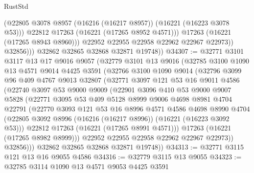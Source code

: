 \begin{lexlean}{RustStd}
\begin{coremodule}
                      (@22805 @3078 @8957 (@16216 (@16217 @8957)) (@16221 (@16223 @3078 @53)))
                      @22812
                      @17263
                      (@16221 (@17265 @8952 @4571)))
                    @17263
                    (@16221 (@17265 @8943 @8960)))
                  @22952
                  @22955
                  @22958
                  @22962
                  @22967
                  @22973))
              @32856)))
        @32862
        @32865
        @32868
        @32871
        @19748))
@34307 := @32771
    @3101
    @3117
    @13
    @17
    @9016
    @9057
    (@32779
      @3101
      @13
      @9016
      (@32785
        @3100
        @1090
        @13
        @4571
        @9014
        @4425
        @3591
        (@32766
          @3100
          @1090
          @9014
          (@32796
            @3099
            @96
            @409
            @4767
            @9013
            @32807
            (@32771
              @3097
              @121
              @53
              @16
              @9011
              @4586
              (@22740
                @3097
                @53
                @9000
                @9009
                (@22901
                  @3096
                  @410
                  @53
                  @9000
                  @9007
                  @5828
                  (@22771
                    @3095
                    @53
                    @409
                    @5128
                    @8999
                    @9006
                    @4698
                    @8981
                    @4704
                    @22791
                    (@22770
                      @3093
                      @121
                      @53
                      @16
                      @8996
                      @4571
                      @4586
                      @4698
                      @8990
                      @4704
                      (@22805 @3092 @8996 (@16216 (@16217 @8996)) (@16221 (@16223 @3092 @53)))
                      @22812
                      @17263
                      (@16221 (@17265 @8991 @4571)))
                    @17263
                    (@16221 (@17265 @8982 @8999)))
                  @22952
                  @22955
                  @22958
                  @22962
                  @22967
                  @22973))
              @32856)))
        @32862
        @32865
        @32868
        @32871
        @19748))
@34313 := @32771 @3115 @121 @13 @16 @9055 @4586
@34316 := @32779 @3115 @13 @9055
@34323 := @32785 @3114 @1090 @13 @4571 @9053 @4425 @3591

\end{coremodule}
\end{lexlean}
